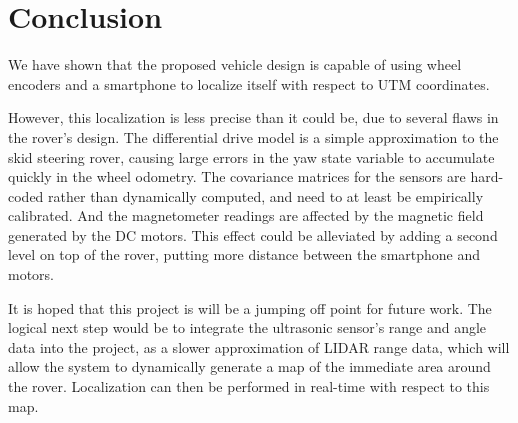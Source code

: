 \chapter*{Conclusion}

We have shown that the proposed vehicle design is capable of using wheel encoders and a smartphone to localize itself with respect to UTM coordinates.

However, this localization is less precise than it could be, due to several flaws in the rover's design. The differential drive model is a simple approximation to the skid steering rover, causing large errors in the yaw state variable to accumulate quickly in the wheel odometry. The covariance matrices for the sensors are hard-coded rather than dynamically computed, and need to at least be empirically calibrated. And the magnetometer readings are affected by the magnetic field generated by the DC motors. This effect could be alleviated by adding a second level on top of the rover, putting more distance between the smartphone and motors.



It is hoped that this project is will be a jumping off point for future work. The logical next step would be to integrate the ultrasonic sensor's range and angle data into the project, as a slower approximation of LIDAR range data, which will allow the system to dynamically generate a map of the immediate area around the rover. Localization can then be performed in real-time with respect to this map.




